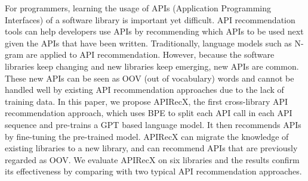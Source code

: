 For programmers, learning the usage of APIs  (Application Programming Interfaces) of a software library is important yet difficult. API recommendation tools can help developers use APIs by recommending which APIs to be used next given the APIs that have been written. Traditionally, language models such as N-gram are applied to API recommendation. However, because the software libraries keep changing and new libraries keep emerging, new APIs are common. These new APIs can be seen as OOV (out of vocabulary) words and cannot be handled well by existing API recommendation approaches due to the lack of training data. In this paper, we propose APIRecX, the first cross-library API recommendation approach, which uses BPE to split each API call in each API sequence and pre-trains a GPT based language model. It then recommends APIs by fine-tuning the pre-trained model. APIRecX can migrate the knowledge of existing libraries to a new library, and can recommend APIs that are previously regarded as OOV. We evaluate APIRecX on six libraries and the results confirm its effectiveness by comparing with two typical API recommendation approaches.
